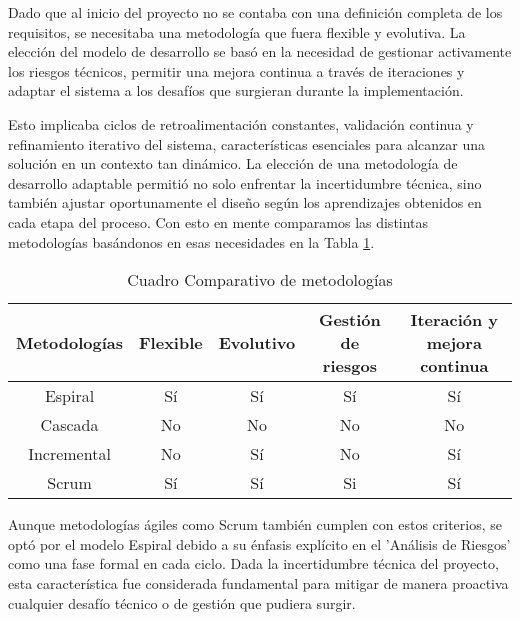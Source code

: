 
Dado que al inicio del proyecto no se contaba con una definición completa de los requisitos, se necesitaba una metodología que fuera flexible y evolutiva. La elección del modelo de desarrollo se basó en la necesidad de gestionar activamente los riesgos técnicos, permitir una mejora continua a través de iteraciones y adaptar el sistema a los desafíos que surgieran durante la implementación.

Esto implicaba ciclos de retroalimentación constantes, validación continua y refinamiento iterativo del sistema, características esenciales para alcanzar una solución en un contexto tan dinámico. La elección de una metodología de desarrollo adaptable permitió no solo enfrentar la incertidumbre técnica, sino también ajustar oportunamente el diseño según los aprendizajes obtenidos en cada etapa del proceso. Con esto en mente comparamos las distintas metodologías basándonos en esas necesidades en la Tabla \ref{tab:comparative-methodologies}.

\begin{table}[h!]
  \doublespacing
  \centering
  \small
  \begin{tabular}{ c c c c c }
    \hline
    Metodologías & Flexible & Evolutivo & Gestión de riesgos & Iteración y mejora continua \\
    \hline
    Espiral      & Sí       & Sí        & Sí                 & Sí                          \\
    Cascada      & No       & No        & No                 & No                          \\
    Incremental  & No       & Sí        & No                 & Sí                          \\
    Scrum        & Sí       & Sí        & Si                 & Sí                          \\
    \hline
  \end{tabular}
  \caption{Cuadro Comparativo de metodologías}
  \label{tab:comparative-methodologies}
\end{table}

Aunque metodologías ágiles como Scrum también cumplen con estos criterios, se optó por el modelo Espiral debido a su énfasis explícito en el 'Análisis de Riesgos' como una fase formal en cada ciclo. Dada la incertidumbre técnica del proyecto, esta característica fue considerada fundamental para mitigar de manera proactiva cualquier desafío técnico o de gestión que pudiera surgir.

